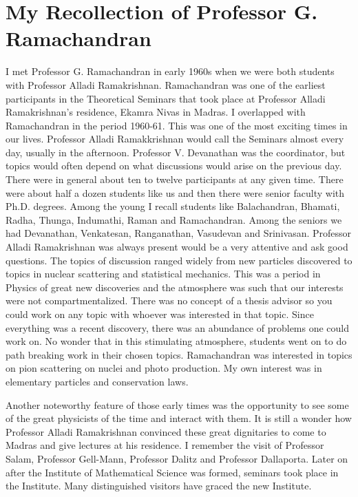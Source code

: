 \chapter{My Recollection of Professor G. Ramachandran}\label{chap6}
\vskip -0.25cm


\vskip -0.25cm

I met Professor G. Ramachandran in early 1960s when we were both students with Professor Alladi Ramakrishnan.  Ramachandran was one of the earliest participants in the Theoretical Seminars that took place at Professor Alladi Ramakrishnan’s residence, Ekamra  Nivas in Madras. I overlapped with Ramachandran in the period 1960-61. This was one of the most exciting times in our lives. Professor Alladi Ramakkrishnan would call the Seminars almost every day, usually in the afternoon. Professor V. Devanathan was the coordinator, but topics would often depend on what discussions would arise on  the previous day. There were in general about ten to twelve participants at any given time. There were about half a dozen students like us and then there were senior faculty with Ph.D. degrees. Among the young I recall students like Balachandran, Bhamati, Radha, Thunga, Indumathi, Raman and Ramachandran. Among the seniors we had Devanathan, Venkatesan, Ranganathan, Vasudevan and Srinivasan. Professor Alladi Ramakrishnan was always present would be a very attentive and ask good questions. The topics of discussion ranged widely from new particles discovered to topics in nuclear scattering and statistical mechanics. This was a period in Physics of great new discoveries and the atmosphere was such that our interests were not compartmentalized. There was no concept of a thesis advisor so you could work on any topic with whoever was interested in that topic. Since everything was a recent discovery, there was an abundance of problems one could work on. No wonder that in this stimulating atmosphere, students went on to do path breaking work in their chosen topics. Ramachandran was interested in topics on pion scattering on nuclei and photo production. My own interest was in  elementary particles and conservation laws. 

Another noteworthy feature of those early times was the opportunity to see some of the great physicists of the time and interact with them. It is still a wonder how Professor Alladi Ramakrishnan convinced these great dignitaries to come to Madras and give lectures at his residence. I remember the visit of Professor Salam, Professor Gell-Mann, Professor Dalitz and Professor Dallaporta. Later on after the Institute of Mathematical Science was formed, seminars took place in the Institute. Many distinguished visitors have graced the new Institute.

